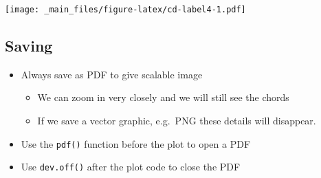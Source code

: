 \documentclass[
]{book}
\providecommand{\tightlist}{%
  \setlength{\itemsep}{0pt}\setlength{\parskip}{0pt}}
\begin{document}
\texttt{[image: \_main\_files/figure-latex/cd-label4-1.pdf]}

\hypertarget{saving}{%
\subsection{Saving}\label{saving}}

\begin{itemize}
\tightlist
\item
  Always save as PDF to give scalable image

  \begin{itemize}
  \tightlist
  \item
    We can zoom in very closely and we will still see the chords
  \item
    If we save a vector graphic, e.g.~PNG these details will disappear.
  \end{itemize}
\item
  Use the \texttt{pdf()} function before the plot to open a PDF
\item
  Use \texttt{dev.off()} after the plot code to close the PDF
\end{itemize}
\end{document}

